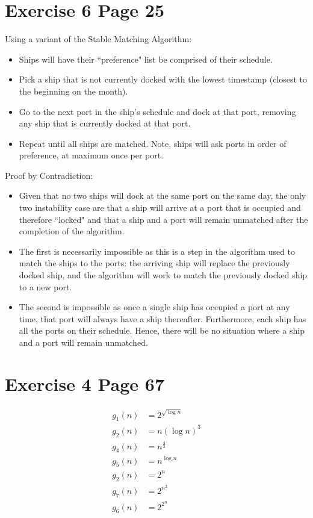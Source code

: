 \documentclass[11pt]{article}
\begin{document}
\section*{Exercise 6 Page 25}
Using a variant of the Stable Matching Algorithm:
\begin{itemize}
\item Ships will have their ``preference" list be comprised of their schedule.
\item Pick a ship that is not currently docked with the lowest timestamp (closest to the beginning on the month).
\item Go to the next port in the ship's schedule and dock at that port, removing any ship that is currently docked at that port.
\item Repeat until all ships are matched. Note, ships will ask ports in order of preference, at maximum once per port.
\end{itemize}
Proof by Contradiction:
\begin{itemize}
\item Given that no two ships will dock at the same port on the same day, the only two instability case are that a ship will arrive at a port that is occupied and therefore ``locked" and that a ship and a port will remain unmatched after the completion of the algorithm.
\item The first is necessarily impossible as this is a step in the algorithm used to match the ships to the ports: the arriving ship will replace the previously docked ship, and the algorithm will work to match the previously docked ship to a new port.
\item The second is impossible as once a single ship has occupied a port at any time, that port will always have a ship thereafter. Furthermore, each ship has all the ports on their schedule. Hence, there will be no situation where a ship and a port will remain unmatched.
\end{itemize}

\section*{Exercise 4 Page 67}
\begin{align}
g_1(n)&=2^{\sqrt{\log n}} \\
g_2(n)&=n(\log n)^3 \\
g_4(n)&=n^{\frac{4}{3}} \\
g_5(n)&=n^{\log n} \\
g_2(n)&=2^n \\
g_7(n)&=2^{n^2} \\
g_6(n)&=2^{2^n}
\end{align}
\newpage
\end{document}
